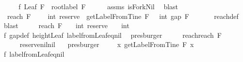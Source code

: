 \begin{isabellebody}
%
\isadelimproof
%
\endisadelimproof
%
\isatagproof
{}\isamarkupfalse%
\ {\isacharminus}\isanewline
\ \ \isamarkupfalse%
\ f{}{\isacharcolon}\ {\isachardoublequoteopen}Leaf\ F\ {\isasymand}\ root{\isacharunderscore}label{\isacharunderscore}{}\ F{\isachardoublequoteclose}\isanewline
\ \ \ \ \isamarkupfalse%
\ assms\ isFork{\isacharunderscore}Nil\ \isamarkupfalse%
\ blast\ \isanewline
\ \ \isamarkupfalse%
\ \isamarkupfalse%
\ {\isachardoublequoteopen}\ reach\ F\ {\isacharbrackleft}{\isacharbrackright}\ {\isacharbrackleft}{\isacharbrackright}\ {\isacharequal}\ \ int\ {\isacharparenleft}reserve\ {\isacharbrackleft}{\isacharbrackright}\ {\isacharparenleft}getLabelFromTine\ F\ {\isacharbrackleft}{\isacharbrackright}{\isacharparenright}{\isacharparenright}\ {\isacharminus}\ int\ {\isacharparenleft}gap\ F\ {\isacharbrackleft}{\isacharbrackright}{\isacharparenright}{\isachardoublequoteclose}\isanewline
\ \ \ \ \isamarkupfalse%
\ reach{\isacharunderscore}def\ \isamarkupfalse%
\ blast\isanewline
\ \ \isamarkupfalse%
\ \isamarkupfalse%
\ {\isachardoublequoteopen}reach\ F\ {\isacharbrackleft}{\isacharbrackright}\ {\isacharbrackleft}{\isacharbrackright}\ {\isacharequal}\ int\ {\isacharparenleft}reserve\ {\isacharbrackleft}{\isacharbrackright}\ {\isacharbrackleft}{\isacharbrackright}{\isacharparenright}\ {\isacharminus}\ int\ {}{\isachardoublequoteclose}\isanewline
\ \ \ \ \isamarkupfalse%
\ f{}\ gap{\isacharunderscore}def\ height{\isacharunderscore}Leaf\ label{\isacharunderscore}from{\isacharunderscore}Leaf{\isacharunderscore}eq{\isacharunderscore}nil\ \isamarkupfalse%
\ presburger\isanewline
\ \ \isamarkupfalse%
\ \isamarkupfalse%
\ reach{}{\isacharcolon}{\isachardoublequoteopen}reach\ F\ {\isacharbrackleft}{\isacharbrackright}\ {\isacharbrackleft}{\isacharbrackright}\ {\isacharequal}\ {}{\isachardoublequoteclose}\isanewline
\ \ \ \ \isamarkupfalse%
\ reserve{\isacharunderscore}nil{\isacharunderscore}nil\ \ \isamarkupfalse%
\ presburger\ \isanewline
\ \ \isamarkupfalse%
\ {\isachardoublequoteopen}{\isasymforall}x{\isachardot}\ getLabelFromTine\ F\ x\ {\isacharequal}\ {\isacharbrackleft}{\isacharbrackright}{\isachardoublequoteclose}\isanewline
\ \ \ \ \isamarkupfalse%
\ f{}\ label{\isacharunderscore}from{\isacharunderscore}Leaf{\isacharunderscore}eq{\isacharunderscore}nil\ \isamarkupfalse%

\end{isabellebody}
